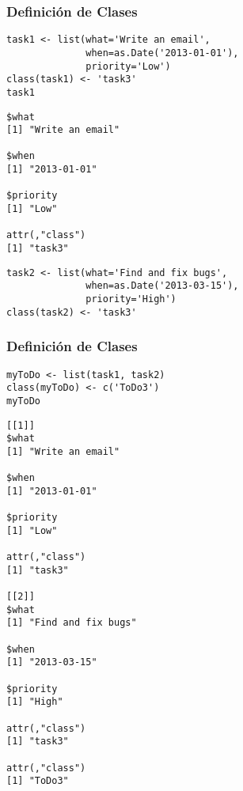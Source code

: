 \documentclass[xcolor={usenames,svgnames,dvipsnames}]{beamer}
\begin{document}
\begin{frame}[fragile]
\frametitle{Definición de Clases}
\label{sec-2-1-3}


\lstset{language=R}
\begin{lstlisting}
task1 <- list(what='Write an email',
              when=as.Date('2013-01-01'),
              priority='Low')
class(task1) <- 'task3'
task1
\end{lstlisting}


\begin{verbatim}
$what
[1] "Write an email"

$when
[1] "2013-01-01"

$priority
[1] "Low"

attr(,"class")
[1] "task3"
\end{verbatim}


\lstset{language=R}
\begin{lstlisting}
task2 <- list(what='Find and fix bugs',
              when=as.Date('2013-03-15'),
              priority='High')
class(task2) <- 'task3'
\end{lstlisting}
\end{frame}
\begin{frame}[fragile]
\frametitle{Definición de Clases}
\label{sec-2-1-4}


\lstset{language=R}
\begin{lstlisting}
myToDo <- list(task1, task2)
class(myToDo) <- c('ToDo3')
myToDo
\end{lstlisting}


\begin{verbatim}
[[1]]
$what
[1] "Write an email"

$when
[1] "2013-01-01"

$priority
[1] "Low"

attr(,"class")
[1] "task3"

[[2]]
$what
[1] "Find and fix bugs"

$when
[1] "2013-03-15"

$priority
[1] "High"

attr(,"class")
[1] "task3"

attr(,"class")
[1] "ToDo3"
\end{verbatim}
\end{frame}
\end{document}
